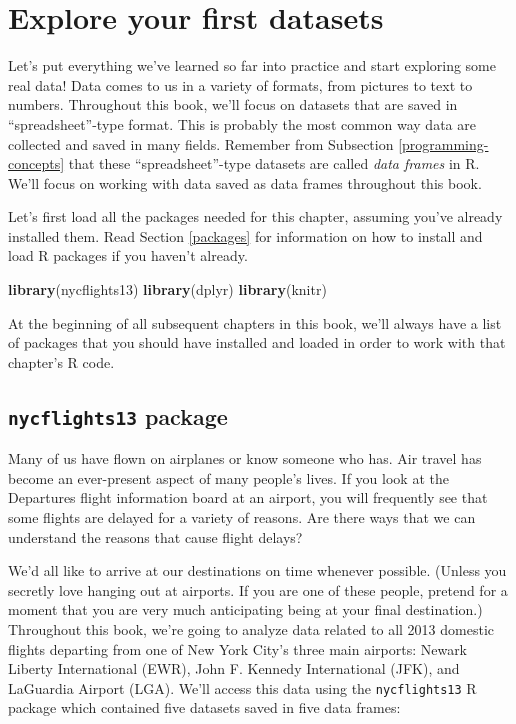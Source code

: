 \documentclass[]{book}
\newenvironment{Shaded}{\begin{snugshade}}{\end{snugshade}}
\newcommand{\KeywordTok}[1]{\textcolor[rgb]{0.13,0.29,0.53}{\textbf{#1}}}
\newcommand{\NormalTok}[1]{#1}
\begin{document}
\hypertarget{nycflights13}{%
\section{Explore your first datasets}\label{nycflights13}}

Let's put everything we've learned so far into practice and start exploring some real data! Data comes to us in a variety of formats, from pictures to text to numbers. Throughout this book, we'll focus on datasets that are saved in ``spreadsheet''-type format. This is probably the most common way data are collected and saved in many fields. Remember from Subsection \ref{programming-concepts} that these ``spreadsheet''-type datasets are called \emph{data frames} in R.  We'll focus on working with data saved as data frames throughout this book.

Let's first load all the packages needed for this chapter, assuming you've already installed them. Read Section \ref{packages} for information on how to install and load R packages if you haven't already.

\begin{Shaded}
\begin{Highlighting}[]
\KeywordTok{library}\NormalTok{(nycflights13)}
\KeywordTok{library}\NormalTok{(dplyr)}
\KeywordTok{library}\NormalTok{(knitr)}
\end{Highlighting}
\end{Shaded}

At the beginning of all subsequent chapters in this book, we'll always have a list of packages that you should have installed and loaded in order to work with that chapter's R code.

\hypertarget{nycflights13-package}{%
\subsection{\texorpdfstring{\texttt{nycflights13} package}{nycflights13 package}}\label{nycflights13-package}}

Many of us have flown on airplanes or know someone who has. Air travel has become an ever-present aspect of many people's lives. If you look at the Departures flight information board at an airport, you will frequently see that some flights are delayed for a variety of reasons. Are there ways that we can understand the reasons that cause flight delays?

We'd all like to arrive at our destinations on time whenever possible. (Unless you secretly love hanging out at airports. If you are one of these people, pretend for a moment that you are very much anticipating being at your final destination.) Throughout this book, we're going to analyze data related to all 2013 domestic flights departing from one of New York City's three main airports: Newark Liberty International (EWR), John F. Kennedy International (JFK), and LaGuardia Airport (LGA). We'll access this data using the \texttt{nycflights13}  R package which contained five datasets saved in five data frames:
\end{document}
